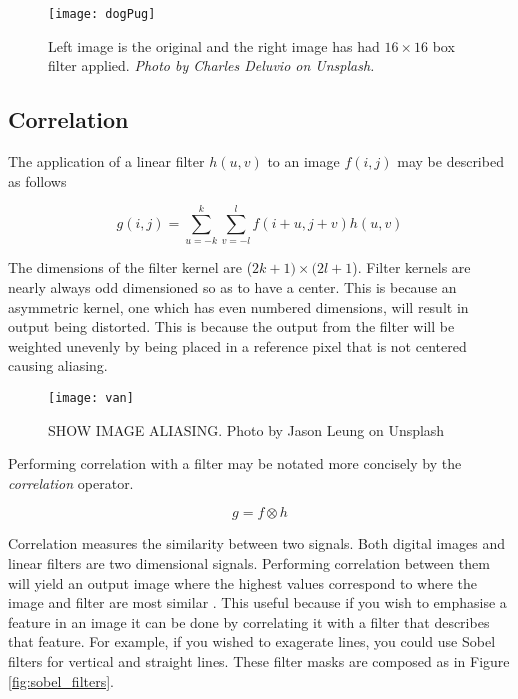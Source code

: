 \begin{figure}[H]
  \centering
  \centering\texttt{[image: dogPug]}
  \caption{Left image is the original and the right image has had $16\times16$ box filter applied. \emph{Photo by Charles Deluvio on Unsplash.}}
  \label{fig:roughDog}
\end{figure}

\subsection{Correlation}

The application of a linear filter $h(u,v)$ to an image $f(i,j)$ may be described as follows

\begin{equation} \label{eq:1}
g(i,j) = \sum_{u=-k}^{k}\sum_{v = -l}^{l}f(i+u,j+v)h(u,v)
\end{equation}


The dimensions of the filter kernel are ($2k+1) \times (2l+1$). Filter kernels are nearly always odd dimensioned so as to have a center. This is because an asymmetric kernel, one which has even numbered dimensions, will result in output being distorted. This is because the output from the filter will be weighted unevenly by being placed in a reference pixel that is not centered causing aliasing.

\begin{figure}[H]
  \centering
  \centering\texttt{[image: van]}
  \caption{SHOW IMAGE ALIASING. Photo by Jason Leung on Unsplash}
  \label{fig:van}
\end{figure}

Performing correlation with a filter may be notated more concisely by the \emph{correlation} operator.

\[g = f \otimes h\]

Correlation measures the similarity between two signals. Both digital images and linear filters are two dimensional signals. Performing correlation between them will yield an output image where the highest values correspond to where the image and filter are most similar \cite{optimalKernel}. This useful because if you wish to emphasise a feature in an image it can be done by correlating it with a filter that describes that feature. For example, if you wished to exagerate lines, you could use Sobel filters for vertical and straight lines. These filter masks are composed as in Figure \ref{fig:sobel_filters}.

